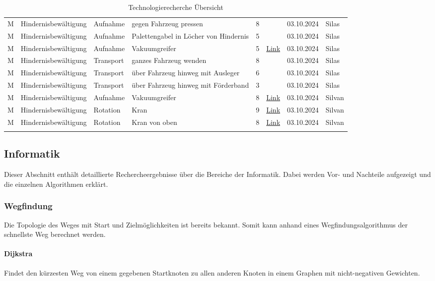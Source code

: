 \documentclass[../main.tex]{subfiles}
\begin{document}
\begin{longtable}{lp{2cm}p{2cm}p{4cm}clcl}
M & Hindernisbewältigung & Aufnahme & gegen Fahrzeug pressen & 8 &  & 03.10.2024 & Silas
\tabularnewline
M & Hindernisbewältigung & Aufnahme & Palettengabel in Löcher von Hindernis  & 5 &  & 03.10.2024 & Silas
\tabularnewline
M & Hindernisbewältigung & Aufnahme & Vakuumgreifer & 5 & \href{https://www.schmalz.com/de-ch/glossar/vakuumgreifer/}{Link} & 03.10.2024 & Silas
\tabularnewline
M & Hindernisbewältigung & Transport & ganzes Fahrzeug wenden & 8 &  & 03.10.2024 & Silas
\tabularnewline
M & Hindernisbewältigung & Transport & über Fahrzeug hinweg mit Ausleger & 6 &  & 03.10.2024 & Silas
\tabularnewline
M & Hindernisbewältigung & Transport & über Fahrzeug hinweg mit Förderband & 3 &  & 03.10.2024 & Silas
\tabularnewline
M & Hindernisbewältigung & Aufnahme & Vakuumgreifer & 8 & \href{https://www.youtube.com/shorts/alxwWgzSVss}{Link}& 03.10.2024 & Silvan
\tabularnewline
M & Hindernisbewältigung & Rotation & Kran & 9 & \href{https://www.youtube.com/watch?v=VZRFHJfUkq4&feature=youtu.be}{Link}& 03.10.2024 & Silvan
\tabularnewline
M & Hindernisbewältigung & Rotation & Kran von oben & 8 & \href{https://www.youtube.com/watch?v=J7LGSNhFTU4}{Link}& 03.10.2024 & Silvan
\tabularnewline
\caption{Technologierecherche Übersicht}
\label{tab:technologierecherche}
\end{longtable}
\normalsize

\newpage
\subsection{Informatik}

Dieser Abschnitt enthält detaillierte Rechercheergebnisse über die Bereiche der Informatik. Dabei werden Vor- und Nachteile aufgezeigt und die einzelnen Algorithmen erklärt.

\subsubsection{Wegfindung}

Die Topologie des Weges mit Start und Zielmöglichkeiten ist bereits bekannt.
Somit kann anhand eines Wegfindungsalgorithmus der schnellste Weg berechnet werden.

\paragraph{Dijkstra}

Findet den kürzesten Weg von einem gegebenen Startknoten zu allen anderen Knoten in einem Graphen mit nicht-negativen Gewichten.
\end{document}

